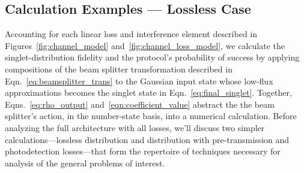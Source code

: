 \documentclass[aps,twocolumn,secnumarabic,amsmath,amssymb,pra,groupedaddress,
showpacs, showkeys]{revtex4-1}
\begin{document}
\subsection{Calculation Examples --- Lossless Case\label{sec:example:first}}

Accounting for each linear loss and interference element described in
Figures~\ref{fig:channel_model} and~\ref{fig:channel_loss_model}, we calculate
the singlet-distribution fidelity and the protocol's probability of success by
applying compositions of the beam splitter transformation described in
Eqn.~\ref{eq:beamsplitter_trans} to the Gaussian input state whose low-flux
approximations becomes the singlet state in
Eqn.~\ref{eq:final_singlet}. Together, Eqns.~\ref{eq:rho_output}
and~\ref{eqn:coefficient_value} abstract the the beam splitter's action, in the
number-state basis, into a numerical calculation. Before analyzing the full
architecture with all losses, we'll discuss two simpler calculations---lossless
distribution and distribution with pre-transmission and photodetection
losses---that form the repertoire of techniques necessary for analysis of the
general problems of interest. 
\end{document}
